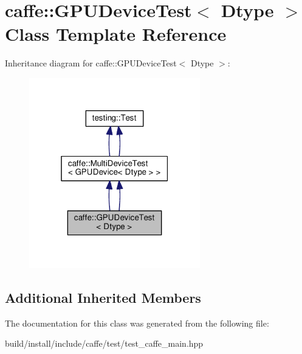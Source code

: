 \hypertarget{classcaffe_1_1_g_p_u_device_test}{}\section{caffe\+:\+:G\+P\+U\+Device\+Test$<$ Dtype $>$ Class Template Reference}
\label{classcaffe_1_1_g_p_u_device_test}


Inheritance diagram for caffe\+:\+:G\+P\+U\+Device\+Test$<$ Dtype $>$\+:
\nopagebreak
\begin{figure}[H]
\begin{center}
\leavevmode
\includegraphics[width=211pt]{classcaffe_1_1_g_p_u_device_test__inherit__graph}
\end{center}
\end{figure}
\subsection*{Additional Inherited Members}


The documentation for this class was generated from the following file\+:\begin{DoxyCompactItemize}
\item 
build/install/include/caffe/test/test\+\_\+caffe\+\_\+main.\+hpp\end{DoxyCompactItemize}
